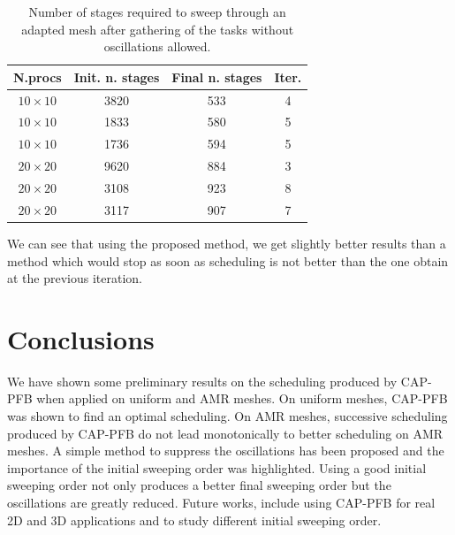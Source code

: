 \documentclass[letterpaper]{article}
\renewcommand{\(}{\left(}
\renewcommand{\)}{\right)}
\renewcommand{\[}{\left[}
\renewcommand{\]}{\right]}
\begin{document}
\begin{table}[H]
  \begin{center}
    \begin{tabular}{|c|c|c|c|}
      \hline
      N.procs & Init. n. stages & Final n. stages & Iter. \\
      \hline
      $10 \times 10$ & 3820 & 533 & 4 \\
      $10 \times 10$ & 1833 & 580 & 5 \\
      $10 \times 10$ & 1736 & 594 & 5 \\
      $20 \times 20$ & 9620 & 884 & 3 \\
      $20 \times 20$ & 3108 & 923 & 8 \\
      $20 \times 20$ & 3117 & 907 & 7 \\
      \hline
    \end{tabular}
    \caption{Number of stages required to sweep through an adapted mesh after
    gathering of the tasks without oscillations allowed.}
    \label{band_3}
  \end{center}
\end{table}

We can see that using the proposed method, we get slightly better results than a
method which would stop as soon as scheduling is not better than the one obtain
at the previous iteration.

\section{Conclusions} \label{conclusions}
We have shown some preliminary results on the scheduling produced by CAP-PFB
when applied on uniform and AMR meshes. On uniform meshes, CAP-PFB was shown to
find an optimal scheduling. On AMR meshes, successive scheduling produced by CAP-PFB do not
lead monotonically to better scheduling on AMR meshes. A simple method to
suppress the oscillations has been proposed and the importance of the initial
sweeping order was highlighted. Using a good initial sweeping order not only
produces a better final sweeping order but the oscillations are greatly reduced.
Future works, include using CAP-PFB for real 2D and 3D applications and to study
different initial sweeping order.




\end{document}
